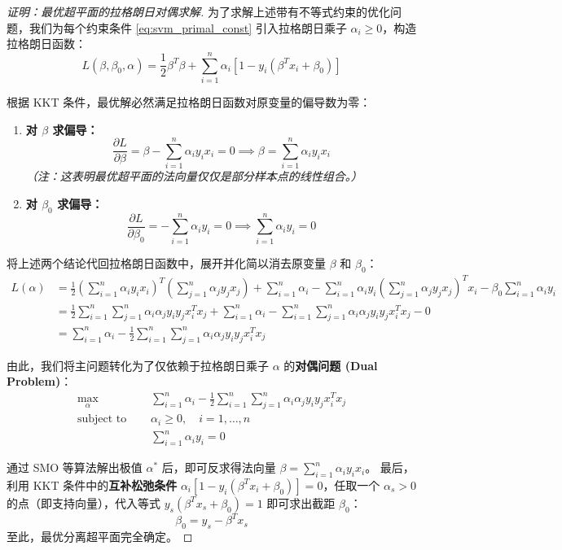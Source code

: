 \documentclass[UTF8]{ctexart}
\numberwithin{equation}{section}
\begin{document}
\begin{proof}[证明：最优超平面的拉格朗日对偶求解]
为了求解上述带有不等式约束的优化问题，我们为每个约束条件 \eqref{eq:svm_primal_const} 引入拉格朗日乘子 $\alpha_i \ge 0$，构造拉格朗日函数：
\[ L(\beta, \beta_0, \alpha) = \frac{1}{2} \beta^T \beta + \sum_{i=1}^n \alpha_i \left[ 1 - y_i(\beta^T x_i + \beta_0) \right] \]

根据 KKT 条件，最优解必然满足拉格朗日函数对原变量的偏导数为零：
\begin{enumerate}
    \item \textbf{对 $\beta$ 求偏导：}
    \[ \frac{\partial L}{\partial \beta} = \beta - \sum_{i=1}^n \alpha_i y_i x_i = 0 \implies \beta = \sum_{i=1}^n \alpha_i y_i x_i \]
    \textit{（注：这表明最优超平面的法向量仅仅是部分样本点的线性组合。）}
    
    \item \textbf{对 $\beta_0$ 求偏导：}
    \[ \frac{\partial L}{\partial \beta_0} = -\sum_{i=1}^n \alpha_i y_i = 0 \implies \sum_{i=1}^n \alpha_i y_i = 0 \]
\end{enumerate}

将上述两个结论代回拉格朗日函数中，展开并化简以消去原变量 $\beta$ 和 $\beta_0$：
\begin{align*}
L(\alpha) &= \frac{1}{2} \left( \sum_{i=1}^n \alpha_i y_i x_i \right)^T \left( \sum_{j=1}^n \alpha_j y_j x_j \right) + \sum_{i=1}^n \alpha_i - \sum_{i=1}^n \alpha_i y_i \left( \sum_{j=1}^n \alpha_j y_j x_j \right)^T x_i - \beta_0 \sum_{i=1}^n \alpha_i y_i \\
&= \frac{1}{2} \sum_{i=1}^n \sum_{j=1}^n \alpha_i \alpha_j y_i y_j x_i^T x_j + \sum_{i=1}^n \alpha_i - \sum_{i=1}^n \sum_{j=1}^n \alpha_i \alpha_j y_i y_j x_i^T x_j - 0 \\
&= \sum_{i=1}^n \alpha_i - \frac{1}{2} \sum_{i=1}^n \sum_{j=1}^n \alpha_i \alpha_j y_i y_j x_i^T x_j
\end{align*}

由此，我们将主问题转化为了仅依赖于拉格朗日乘子 $\alpha$ 的\textbf{对偶问题 (Dual Problem)}：
\begin{align*}
\max_{\alpha} \quad & \sum_{i=1}^n \alpha_i - \frac{1}{2} \sum_{i=1}^n \sum_{j=1}^n \alpha_i \alpha_j y_i y_j x_i^T x_j \\
\text{subject to } \quad & \alpha_i \ge 0, \quad i=1,\dots,n \\
& \sum_{i=1}^n \alpha_i y_i = 0
\end{align*}

通过 SMO 等算法解出极值 $\alpha^*$ 后，即可反求得法向量 $\beta = \sum_{i=1}^n \alpha_i y_i x_i$。
最后，利用 KKT 条件中的\textbf{互补松弛条件} $\alpha_i [1 - y_i(\beta^T x_i + \beta_0)] = 0$，任取一个 $\alpha_s > 0$ 的点（即支持向量），代入等式 $y_s(\beta^T x_s + \beta_0) = 1$ 即可求出截距 $\beta_0$：
\[ \beta_0 = y_s - \beta^T x_s \]
至此，最优分离超平面完全确定。
\end{proof}
\end{document}
